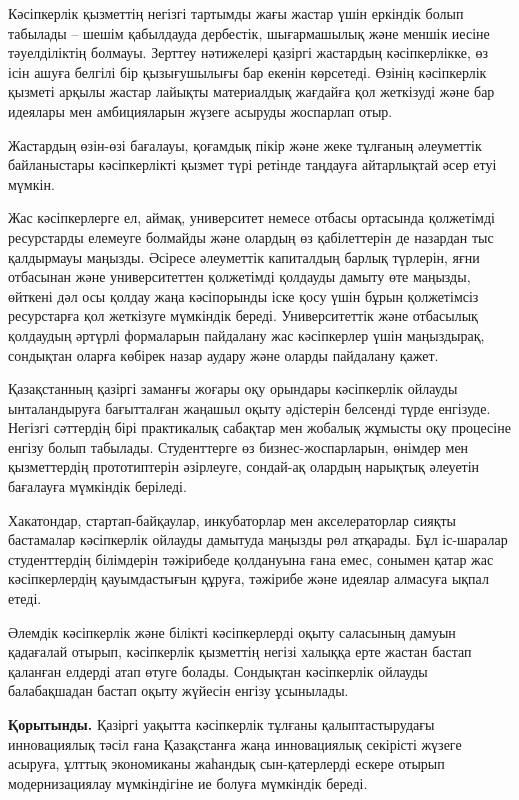 \begin{multicols}{2}

Кәсіпкерлік қызметтің негізгі тартымды жағы жастар үшін еркіндік болып
табылады -- шешім қабылдауда дербестік, шығармашылық және меншік иесіне
тәуелділіктің болмауы. Зерттеу нәтижелері қазіргі жастардың
кәсіпкерлікке, өз ісін ашуға белгілі бір қызығушылығы бар екенін
көрсетеді. Өзінің кәсіпкерлік қызметі арқылы жастар лайықты материалдық
жағдайға қол жеткізуді және бар идеялары мен амбицияларын жүзеге асыруды
жоспарлап отыр.

Жастардың өзін-өзі бағалауы, қоғамдық пікір және жеке тұлғаның
әлеуметтік байланыстары кәсіпкерлікті қызмет түрі ретінде таңдауға
айтарлықтай әсер етуі мүмкін.

Жас кәсіпкерлерге ел, аймақ, университет немесе отбасы ортасында
қолжетімді ресурстарды елемеуге болмайды және олардың өз қабілеттерін де
назардан тыс қалдырмауы маңызды. Әсіресе әлеуметтік капиталдың барлық
түрлерін, яғни отбасынан және университеттен қолжетімді қолдауды дамыту
өте маңызды, өйткені дәл осы қолдау жаңа кәсіпорынды іске қосу үшін
бұрын қолжетімсіз ресурстарға қол жеткізуге мүмкіндік береді.
Университеттік және отбасылық қолдаудың әртүрлі формаларын пайдалану жас
кәсіпкерлер үшін маңыздырақ, сондықтан оларға көбірек назар аудару және
оларды пайдалану қажет.

Қазақстанның қазіргі заманғы жоғары оқу орындары кәсіпкерлік ойлауды
ынталандыруға бағытталған жаңашыл оқыту әдістерін белсенді түрде
енгізуде. Негізгі сәттердің бірі практикалық сабақтар мен жобалық
жұмысты оқу процесіне енгізу болып табылады. Студенттерге өз
бизнес-жоспарларын, өнімдер мен қызметтердің прототиптерін әзірлеуге,
сондай-ақ олардың нарықтық әлеуетін бағалауға мүмкіндік беріледі.

Хакатондар, стартап-байқаулар, инкубаторлар мен акселераторлар сияқты
бастамалар кәсіпкерлік ойлауды дамытуда маңызды рөл атқарады. Бұл
іс-шаралар студенттердің білімдерін тәжірибеде қолдануына ғана емес,
сонымен қатар жас кәсіпкерлердің қауымдастығын құруға, тәжірибе және
идеялар алмасуға ықпал етеді.

Әлемдік кәсіпкерлік және білікті кәсіпкерлерді оқыту саласының дамуын
қадағалай отырып, кәсіпкерлік қызметтің негізі халыққа ерте жастан
бастап қаланған елдерді атап өтуге болады. Сондықтан кәсіпкерлік ойлауды
балабақшадан бастап оқыту жүйесін енгізу ұсынылады.

{\bfseries Қорытынды.} Қазіргі уақытта кәсіпкерлік тұлғаны қалыптастырудағы
инновациялық тәсіл ғана Қазақстанға жаңа инновациялық секірісті жүзеге
асыруға, ұлттық экономиканы жаһандық сын-қатерлерді ескере отырып
модернизациялау мүмкіндігіне ие болуға мүмкіндік береді.


\end{multicols}
